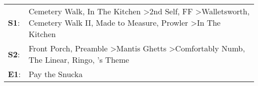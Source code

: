 \begin{supertabular}{p{0.03\textwidth}p{0.92\textwidth}}
 \textbf{S1}:  &  Cemetery Walk\textsuperscript{}, \enspace In The Kitchen\textsuperscript{} \textgreater \enspace 2nd Self\textsuperscript{}, \enspace FF\textsuperscript{} \textgreater \enspace Walletsworth\textsuperscript{}, \enspace Cemetery Walk II\textsuperscript{}, \enspace Made to Measure\textsuperscript{}, \enspace Prowler\textsuperscript{} \textgreater \enspace In The Kitchen\textsuperscript{}  \enspace  \\
 \textbf{S2}:  &                                                                                                    Front Porch\textsuperscript{}, \enspace Preamble\textsuperscript{} \textgreater \enspace Mantis Ghetts\textsuperscript{} \textgreater \enspace Comfortably Numb\textsuperscript{}, \enspace The Linear\textsuperscript{}, \enspace Ringo\textsuperscript{}, 's Theme\textsuperscript{}  \enspace  \\
 \textbf{E1}:  &                                                                                                                                                                                                                                                                                                                                                                     Pay the Snucka\textsuperscript{}  \enspace  \\
\end{supertabular}

